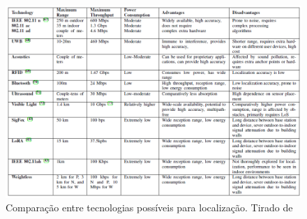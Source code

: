 \begin{figure}[H]
	\centering 
	\includegraphics[scale = 0.7]{images/technologies_table.png}
	\caption{Comparação entre tecnologias possíveis para localização. Tirado de \cite{art2}}
	\label{fig:technologies_table}
\end{figure}
